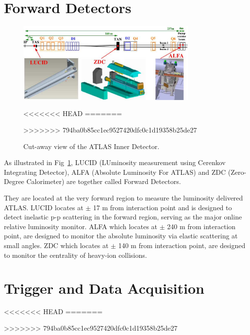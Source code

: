 \section{Forward Detectors}
\label{sec:for}
\begin{figure}[htbp]
 \begin{center}
 \includegraphics[width=0.8\textwidth]{chapters/c4/figures/forward}
 \end{center}
 \caption{Cut-away view of the ATLAS Inner Detector.}
<<<<<<< HEAD
=======

>>>>>>> 794ba0b85cc1ec9527420dfc0c1d19358b25de27
 \label{fig:forward}
\end{figure}
\par As illustrated in Fig~\ref{fig:forward}, LUCID (LUminosity measurement using Cerenkov Integrating Detector), ALFA (Absolute Luminosity For ATLAS) and ZDC 
 (Zero-Degree Calorimeter) are together called Forward Detectors. 
 \par They are located at the very forward region to measure the luminosity delivered ATLAS. LUCID locates at $\pm$ 17 m from interaction point and is designed to 
 detect inelastic p-p scattering in the forward region, serving as the major online relative luminosity monitor. 
 ALFA which locates at $\pm$ 240 m from interaction point, are designed to monitor the absolute luminosity via elastic scattering at small angles. 
 ZDC which locates at $\pm$ 140 m from interaction point, are designed to monitor the centrality of heavy-ion collisions.

\section{Trigger and Data Acquisition}
<<<<<<< HEAD
=======

>>>>>>> 794ba0b85cc1ec9527420dfc0c1d19358b25de27
\label{sec:data}

